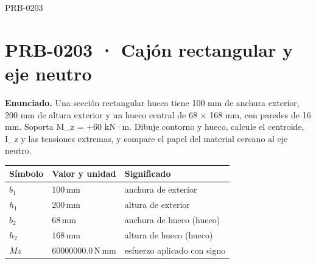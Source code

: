 \begin{studiumworked}{PRB-0203}

\section{PRB-0203 · Cajón rectangular y eje neutro}

\textbf{Enunciado.} Una sección rectangular hueca tiene 100 mm de anchura exterior, 200 mm de altura exterior y un hueco central de 68 \ensuremath{\times} 168 mm, con paredes de 16 mm. Soporta M\_z = +60 kN·m. Dibuje contorno y hueco, calcule el centroide, I\_z y las tensiones extremas, y compare el papel del material cercano al eje neutro.

\par\medskip\noindent\begin{tabular}{@{}p{.18\linewidth}p{.26\linewidth}p{.48\linewidth}@{}}
\toprule Símbolo & Valor y unidad & Significado\\\midrule
$b_{1}$ & $100\,\mathrm{mm}$ & anchura de exterior\\
$h_{1}$ & $200\,\mathrm{mm}$ & altura de exterior\\
$b_{2}$ & $68\,\mathrm{mm}$ & anchura de hueco (hueco)\\
$h_{2}$ & $168\,\mathrm{mm}$ & altura de hueco (hueco)\\
$Mz$ & $60000000.0\,\mathrm{N\,mm}$ & esfuerzo aplicado con signo\\
\bottomrule\end{tabular}\par\medskip


\end{studiumworked}
